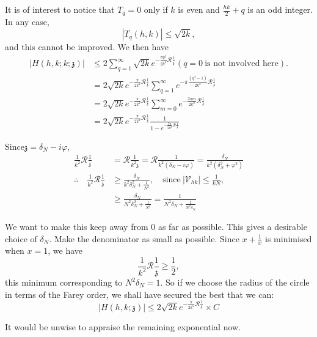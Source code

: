It is of interest to notice that $T_q=0$ only if $k$ is even and
$\frac{hk}{2}+ q$ is an odd integer. In any case,
$$
|T_q (h, k)| \leq \sqrt{2k},
$$
and this cannot be improved. We then have
\begin{align*}
  |H (h, k; k; \mathfrak{z})| & \leq 2 \sum^\infty_{q=1} \sqrt{2k} e^{-
    \frac{\pi q^2}{2k^2} \mathscr{R} \frac{1}{\mathfrak{z}}} (q=0
  ~\text{is not involved here}).\\
  & = 2 \sqrt{2k} e^{- \frac{\pi}{2 k^2} \mathscr{R}
    \frac{1}{\mathfrak{z}}} \sum^\infty_{q=1} e^{- \pi
    \frac{(q^2-1)}{2k^2} \mathscr{R} \frac{1}{\mathfrak{z}}}\\
    & = 2 \sqrt{2k} e^{- \frac{\pi}{2k^2} \mathscr{R}
    \frac{1}{\mathfrak{z}}} \sum^\infty_{m=0} e^{- \frac{3 \pi m}{2
      k^2} \mathscr{R} \frac{1}{\mathfrak{z}}}\\
  & = 2 \sqrt{2k} e^{- \frac{\pi}{2k^2} \mathscr{R}
    \frac{1}{\mathfrak{z}}} \frac{1}{1- e^{- \frac{3 \pi}{2k^2}
      \mathscr{R} \frac{1}{\mathfrak{z}}}}
\end{align*}

Since\pageoriginale $\mathfrak{z} = \delta_N - i \varphi$,
\begin{align*}
  \frac{1}{k^2} \mathscr{R} \frac{1}{\mathfrak{z}} & = \mathscr{R}
  \frac{1}{k^2 \mathfrak{z}} = \mathscr{R} \frac{1}{k^2 (\delta_N - i
    \varphi)} = \frac{\delta_N}{k^2 (\delta^2_N + \varphi^2)}\\
    \therefore \quad \frac{1}{k^2} \mathscr{R} \frac{1}{\mathfrak{z}}
    & \geq \frac{\delta_N}{k^2 \delta^2_N + \frac{1}{N^2}}, \quad
      \text{since}~ |\mathscr{V}_{hk}| \leq \frac{1}{kN},\\
      & \geq \frac{\delta_N}{N^2 \delta^2_N + \frac{1}{N^2}}=
      \frac{1}{N^2 \delta_N + \frac{1}{N^2 \delta_N}}
\end{align*}

We want to make this keep away from 0 as far as possible. This gives a
desirable choice of $\delta_N$. Make the denominator as small as
possible. Since $x+ \frac{1}{x}$ is minimised when $x=1$, we have 
$$
\frac{1}{k^2} \mathscr{R} \frac{1}{\mathfrak{z}} \geq \frac{1}{2}, 
$$
this minimum corresponding to $N^2 \delta_N =1$. So if we choose the
radius of the circle in terms of the Farey order, we shall have
secured the best that we can:
$$
|H (h, k; \mathfrak{z})| \leq 2 \sqrt{2k} e^{- \frac{\pi}{2k^2}
  \mathscr{R} \frac{1}{\mathfrak{z}}} \times C
$$

It would be unwise to appraise the remaining exponential now. 
